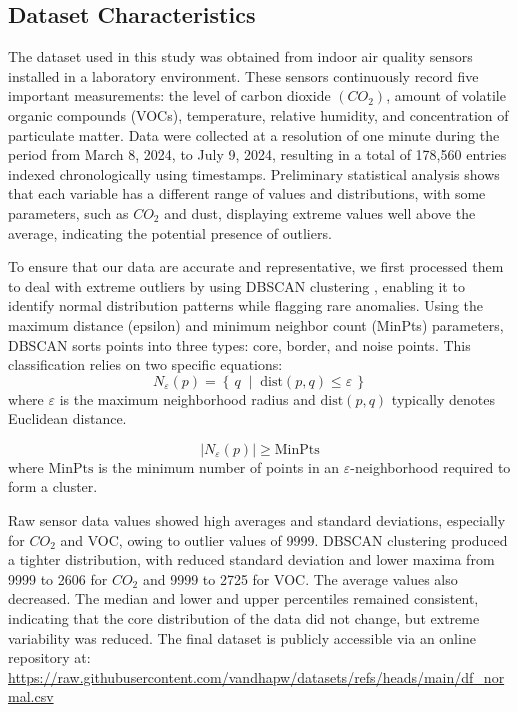 \subsection{Dataset Characteristics}
The dataset used in this study was obtained from indoor air quality sensors installed in a laboratory environment. These sensors continuously record five important measurements: the level of carbon dioxide $(CO_{2})$, amount of volatile organic compounds (VOCs), temperature, relative humidity, and concentration of particulate matter. Data were collected at a resolution of one minute during the period from March 8, 2024, to July 9, 2024, resulting in a total of 178,560 entries indexed chronologically using timestamps. Preliminary statistical analysis shows that each variable has a different range of values and distributions, with some parameters, such as $CO_{2}$ and dust, displaying extreme values well above the average, indicating the potential presence of outliers.

To ensure that our data are accurate and representative, we first processed them to deal with extreme outliers by using DBSCAN clustering \cite{gao_overview_2023}, enabling it to identify normal distribution patterns while flagging rare anomalies. Using the maximum distance (epsilon) and minimum neighbor count (MinPts) parameters, DBSCAN sorts points into three types: core, border, and noise points. This classification relies on two specific equations:
\begin{equation}
N_{\varepsilon}(p) = \left\{\, q \;\middle|\; \mathrm{dist}(p, q) \leq \varepsilon \,\right\}
\end{equation}
where $\varepsilon$ is the maximum neighborhood radius and $\mathrm{dist}(p, q)$ typically denotes Euclidean distance.

\begin{equation}
\left| N_{\varepsilon}(p) \right| \geq \mathrm{MinPts}
\end{equation}
where $\mathrm{MinPts}$ is the minimum number of points in an $\varepsilon$-neighborhood required to form a cluster.

Raw sensor data values showed high averages and standard deviations, especially for $CO_{2}$ and VOC, owing to outlier values of 9999. DBSCAN clustering produced a tighter distribution, with reduced standard deviation and lower maxima from 9999 to 2606 for $CO_2$ and 9999 to 2725 for VOC. The average values also decreased. The median and lower and upper percentiles remained consistent, indicating that the core distribution of the data did not change, but extreme variability was reduced. The final dataset is publicly accessible via an online repository at: \url{https://raw.githubusercontent.com/vandhapw/datasets/refs/heads/main/df_normal.csv}

